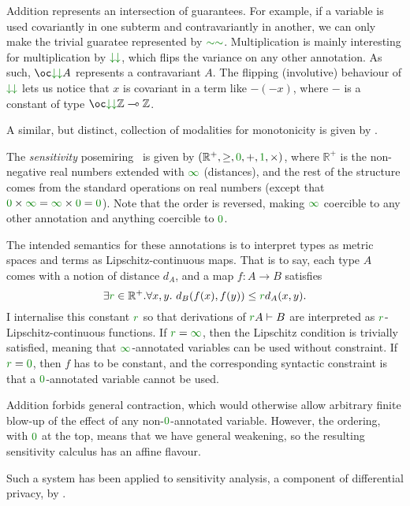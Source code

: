 \begin{example}
{
  }

  Addition represents an intersection of guarantees.
  For example, if a variable is used covariantly in one subterm and
  contravariantly in another, we can only make the trivial guaratee represented
  by $\gr{\sim\sim}$.
  Multiplication is mainly interesting for multiplication by
  $\gr{\downarrow\downarrow}$, which flips the variance on any other annotation.
  As such, $\oc\gr{\downarrow\downarrow}A$ represents a contravariant $A$.
  The flipping (involutive) behaviour of $\gr{\downarrow\downarrow}$ lets us
  notice that $x$ is covariant in
  a term like $-(-x)$, where $-$ is a constant of type
  $\oc\gr{\downarrow\downarrow}\mathbb Z \multimap \mathbb Z$.

  A similar, but distinct, collection of modalities for monotonicity is given by
  \citet{Arntzenius19}.
\end{example}

\begin{example}\label{def:sensitivity-posemiring}
  The \emph{sensitivity} posemiring~\citep{reed10distance} is given by
  $(\mathbb R^+, \geq, \gr0, +, \gr1, \times)$, where $\mathbb R^+$ is the
  non-negative real numbers extended with $\gr\infty$ (distances), and the rest
  of the structure comes from the standard operations on real numbers (except
  that $\gr0 \times \gr\infty = \gr\infty \times \gr0 = \gr0$).
  Note that the order is reversed, making $\gr\infty$ coercible to any other
  annotation and anything coercible to $\gr0$.

  The intended semantics for these annotations is to interpret types as metric
  spaces and terms as Lipschitz-continuous maps.
  That is to say, each type $A$ comes with a notion of distance $d_A$, and a map
  $f : A \to B$ satisfies
  \[
    \exists\gr r \in \mathbb R^+.\forall x,y.~%
    d_B(f(x), f(y)) \leq \gr rd_A(x, y).
  \]
  I internalise this constant $\gr r$ so that derivations of
  $\gr rA \vdash B$ are interpreted as $\gr r$-Lipschitz-continuous functions.
  If $\gr r = \gr\infty$, then the Lipschitz condition is trivially satisfied,
  meaning that $\gr\infty$-annotated variables can be used without constraint.
  If $\gr r = \gr0$, then $f$ has to be constant, and the corresponding
  syntactic constraint is that a $\gr0$-annotated variable cannot be used.

  Addition forbids general contraction, which would otherwise allow arbitrary
  finite blow-up of the effect of any non-$\gr0$-annotated variable.
  However, the ordering, with $\gr0$ at the top, means that we have general
  weakening, so the resulting sensitivity calculus has an affine flavour.

  Such a system has been applied to sensitivity analysis, a component of
  differential privacy, by \citet{reed10distance}.
\end{example}
